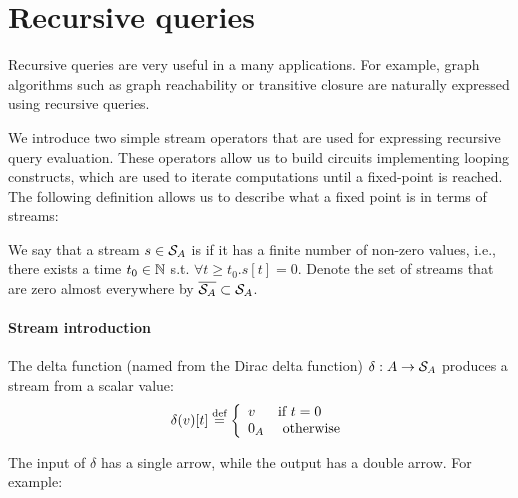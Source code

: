 \section{Recursive queries}\label{sec:recursion}

Recursive queries are very useful in a many applications.
For example, graph algorithms such as graph reachability
or transitive closure are naturally expressed using recursive queries.

We introduce two simple \dbsp stream operators that are used for
expressing recursive query evaluation.  These operators allow us
to build circuits implementing looping constructs, which
are used to iterate computations until a fixed-point is reached.
The following definition allows us to describe what a fixed point is
in terms of streams:

\begin{definition}\label{def:zae}
We say that a stream $s \in \mathcal{S}_{A}$ is  if it has a finite
number of non-zero values, i.e., there exists a time $t_0 \in \mathbb{N}$
s.t. $\forall t \geq t_0 . s[t] = 0$.
\noindent Denote the set of streams that are zero almost everywhere
by $\overline{\mathcal{S}_{A}} \subset \mathcal{S}_{A}$.
\end{definition}

\paragraph{Stream introduction}

The delta function (named from the Dirac delta function) $\delta : A \rightarrow \mathcal{S}_{A}$
produces a stream from a scalar value:
$$\delta(v)[t] \stackrel{\textrm{\scriptsize def}}{=} \left\{
\begin{array}{ll}
  v & \mbox{if } t = 0 \\
  0_A & \mbox{ otherwise}
\end{array}
\right.
$$

The input of $\delta$ has a single arrow, while the output has a
double arrow.  For example:

\begin{center}
\end{center}

